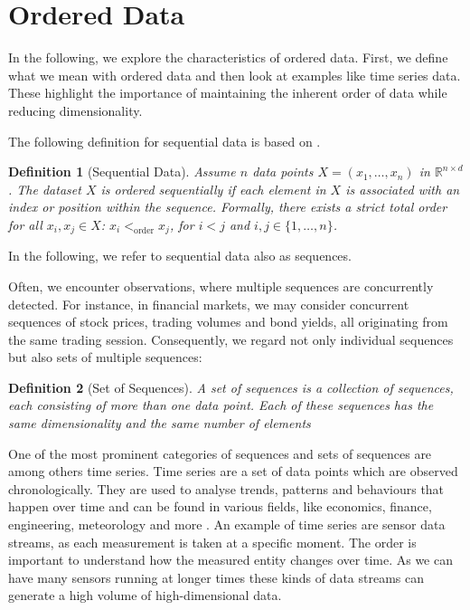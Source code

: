 \documentclass[pdftex,12pt,a4paper]{report}
\newtheorem{definition}{Definition}[section]
\begin{document}
\section{Ordered Data} \label{ordered-data}
In the following, we explore the characteristics of ordered data.
First, we define what we mean with ordered data and then look at examples like time series data.
These highlight the importance of maintaining the inherent order of data while reducing dimensionality.

The following definition for sequential data is based on \cite{dropp}.
\begin{definition}[Sequential Data] \label{def:sequences}
    Assume $n$ data points $X = (x_1, \dots, x_n)$ in $\mathbb{R}^{n \times d}$. 
    The dataset $X$ is ordered sequentially if 
    each element in $X$ is associated with an index or position within the sequence.
    Formally, there exists a strict total order for all $x_i, x_j \in X$: $ x_i <_{\mathrm{order}} x_j$, for $i < j$ and $i,j \in \{1, \dots, n \}$.
\end{definition}

In the following, we refer to sequential data also as sequences.

Often, we encounter observations, where multiple sequences are concurrently detected.
For instance, in financial markets, we may consider concurrent sequences of stock prices, trading volumes and bond yields, all originating from the same trading session.
Consequently, we regard not only individual sequences but also sets of multiple sequences:

\begin{definition}[Set of Sequences] \label{def:set-sequences}
    A set of sequences is a collection of sequences, each consisting of more than one data point.
    Each of these sequences has the same dimensionality and the same number of elements
\end{definition}

One of the most prominent categories of sequences and sets of sequences are among others time series.
Time series are a set of data points which are observed chronologically.
They are used to analyse trends, patterns and behaviours that happen over time and can be found in various fields, like economics, finance, engineering, meteorology and more \cite{timeseries}.
An example of time series are sensor data streams, as each measurement is taken at a specific moment.
The order is important to understand how the measured entity changes over time.
As we can have many sensors running at longer times these kinds of data streams can generate a high volume of high-dimensional data.
\end{document}

